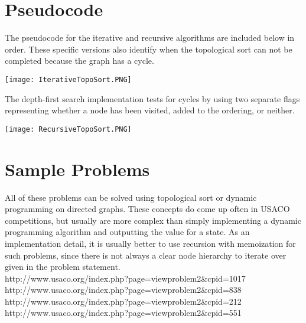 \documentclass{article}
\begin{document}
\section{Pseudocode}
The pseudocode for the iterative and recursive algorithms are included below in order. These specific versions also identify when the topological sort can not be completed because the graph has a cycle.
\begin{center}
  \texttt{[image: IterativeTopoSort.PNG]}
\end{center}
The depth-first search implementation tests for cycles by using two separate flags representing whether a node has been visited, added to the ordering, or neither.
\begin{center}
  \texttt{[image: RecursiveTopoSort.PNG]}
\end{center}
\section{Sample Problems}
All of these problems can be solved using topological sort or dynamic programming on directed graphs. These concepts do come up often in USACO competitions, but usually are more complex than simply implementing a dynamic programming algorithm and outputting the value for a state. As an implementation detail, it is usually better to use recursion with memoization for such problems, since there is not always a clear node hierarchy to iterate over given in the problem statement.
\\
\hfill\break
http://www.usaco.org/index.php?page=viewproblem2\&cpid=1017
\\
http://www.usaco.org/index.php?page=viewproblem2\&cpid=838
\\
http://www.usaco.org/index.php?page=viewproblem2\&cpid=212
\\
http://www.usaco.org/index.php?page=viewproblem2\&cpid=551
\end{document}
